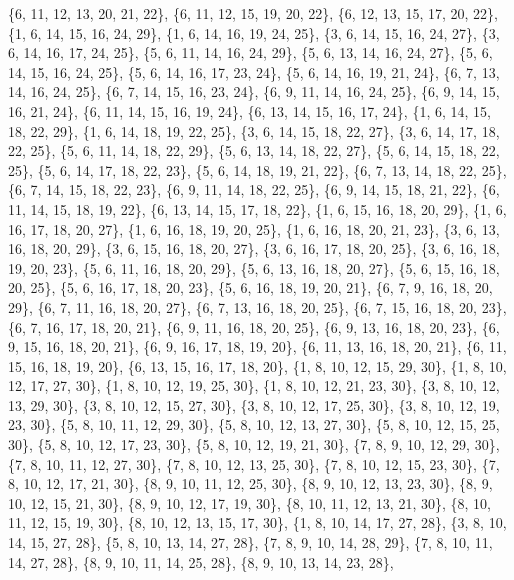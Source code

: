 \documentclass[11pt,a4paper]{article}
\begin{document}
{\{6, 11, 12, 13, 20, 21, 22\}, \{6, 11, 12, 15, 19, 20, 22\}, \{6, 12, 13, 15, 17, 20, 22\}, \{1, 6, 14, 15, 16, 24, 29\}, \{1, 6, 14, 16, 19, 24, 25\},
\{3, 6, 14, 15, 16, 24, 27\}, \{3, 6, 14, 16, 17, 24, 25\}, \{5, 6, 11, 14, 16, 24, 29\}, \{5, 6, 13, 14, 16, 24, 27\}, \{5, 6, 14, 15, 16, 24, 25\},
\{5, 6, 14, 16, 17, 23, 24\}, \{5, 6, 14, 16, 19, 21, 24\}, \{6, 7, 13, 14, 16, 24, 25\}, \{6, 7, 14, 15, 16, 23, 24\}, \{6, 9, 11, 14, 16, 24, 25\},
\{6, 9, 14, 15, 16, 21, 24\}, \{6, 11, 14, 15, 16, 19, 24\}, \{6, 13, 14, 15, 16, 17, 24\}, \{1, 6, 14, 15, 18, 22, 29\}, \{1, 6, 14, 18, 19, 22, 25\},
\{3, 6, 14, 15, 18, 22, 27\}, \{3, 6, 14, 17, 18, 22, 25\}, \{5, 6, 11, 14, 18, 22, 29\}, \{5, 6, 13, 14, 18, 22, 27\}, \{5, 6, 14, 15, 18, 22, 25\},
\{5, 6, 14, 17, 18, 22, 23\}, \{5, 6, 14, 18, 19, 21, 22\}, \{6, 7, 13, 14, 18, 22, 25\}, \{6, 7, 14, 15, 18, 22, 23\}, \{6, 9, 11, 14, 18, 22, 25\},
\{6, 9, 14, 15, 18, 21, 22\}, \{6, 11, 14, 15, 18, 19, 22\}, \{6, 13, 14, 15, 17, 18, 22\}, \{1, 6, 15, 16, 18, 20, 29\}, \{1, 6, 16, 17, 18, 20, 27\},
\{1, 6, 16, 18, 19, 20, 25\}, \{1, 6, 16, 18, 20, 21, 23\}, \{3, 6, 13, 16, 18, 20, 29\}, \{3, 6, 15, 16, 18, 20, 27\}, \{3, 6, 16, 17, 18, 20, 25\},
\{3, 6, 16, 18, 19, 20, 23\}, \{5, 6, 11, 16, 18, 20, 29\}, \{5, 6, 13, 16, 18, 20, 27\}, \{5, 6, 15, 16, 18, 20, 25\}, \{5, 6, 16, 17, 18, 20, 23\},
\{5, 6, 16, 18, 19, 20, 21\}, \{6, 7, 9, 16, 18, 20, 29\}, \{6, 7, 11, 16, 18, 20, 27\}, \{6, 7, 13, 16, 18, 20, 25\}, \{6, 7, 15, 16, 18, 20, 23\},
\{6, 7, 16, 17, 18, 20, 21\}, \{6, 9, 11, 16, 18, 20, 25\}, \{6, 9, 13, 16, 18, 20, 23\}, \{6, 9, 15, 16, 18, 20, 21\}, \{6, 9, 16, 17, 18, 19, 20\},
\{6, 11, 13, 16, 18, 20, 21\}, \{6, 11, 15, 16, 18, 19, 20\}, \{6, 13, 15, 16, 17, 18, 20\}, \{1, 8, 10, 12, 15, 29, 30\}, \{1, 8, 10, 12, 17, 27, 30\},
\{1, 8, 10, 12, 19, 25, 30\}, \{1, 8, 10, 12, 21, 23, 30\}, \{3, 8, 10, 12, 13, 29, 30\}, \{3, 8, 10, 12, 15, 27, 30\}, \{3, 8, 10, 12, 17, 25, 30\},
\{3, 8, 10, 12, 19, 23, 30\}, \{5, 8, 10, 11, 12, 29, 30\}, \{5, 8, 10, 12, 13, 27, 30\}, \{5, 8, 10, 12, 15, 25, 30\}, \{5, 8, 10, 12, 17, 23, 30\},
\{5, 8, 10, 12, 19, 21, 30\}, \{7, 8, 9, 10, 12, 29, 30\}, \{7, 8, 10, 11, 12, 27, 30\}, \{7, 8, 10, 12, 13, 25, 30\}, \{7, 8, 10, 12, 15, 23, 30\},
\{7, 8, 10, 12, 17, 21, 30\}, \{8, 9, 10, 11, 12, 25, 30\}, \{8, 9, 10, 12, 13, 23, 30\}, \{8, 9, 10, 12, 15, 21, 30\}, \{8, 9, 10, 12, 17, 19, 30\},
\{8, 10, 11, 12, 13, 21, 30\}, \{8, 10, 11, 12, 15, 19, 30\}, \{8, 10, 12, 13, 15, 17, 30\}, \{1, 8, 10, 14, 17, 27, 28\}, \{3, 8, 10, 14, 15, 27, 28\},
\{5, 8, 10, 13, 14, 27, 28\}, \{7, 8, 9, 10, 14, 28, 29\}, \{7, 8, 10, 11, 14, 27, 28\}, \{8, 9, 10, 11, 14, 25, 28\}, \{8, 9, 10, 13, 14, 23, 28\},
}
\end{document}
